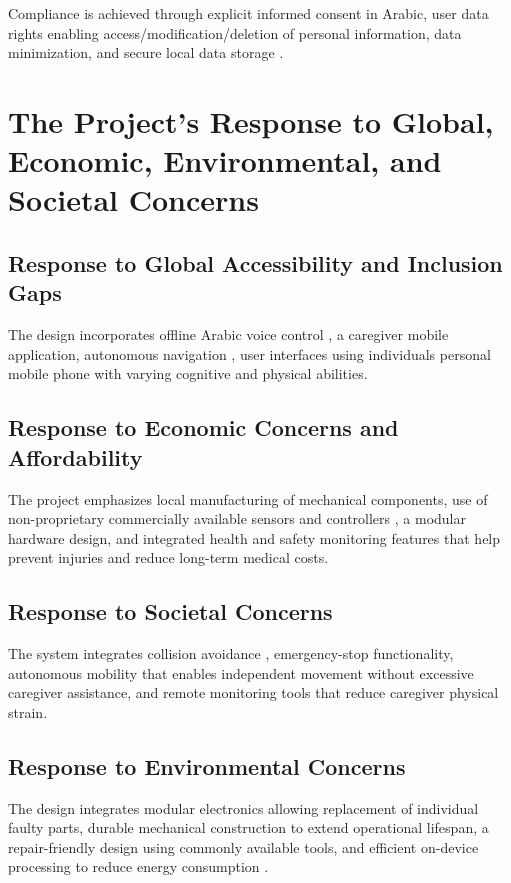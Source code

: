 \documentclass[12pt,a4paper]{report}
\begin{document}
Compliance is achieved through explicit informed consent in Arabic, user data rights enabling access/modification/deletion of personal information, data minimization, and secure local data storage \cite{egypt_law_151}.

\section{The Project's Response to Global, Economic, Environmental, and Societal Concerns}

\subsection{Response to Global Accessibility and Inclusion Gaps}

The design incorporates offline Arabic voice control , a caregiver mobile application, autonomous navigation \cite{nav2},  user interfaces using individuals personal mobile phone with varying cognitive and physical abilities.

\subsection{Response to Economic Concerns and Affordability}

The project emphasizes local manufacturing of mechanical components, use of non-proprietary commercially available sensors and controllers \cite{elalfy_monocular}, a modular hardware design, and integrated health and safety monitoring features that help prevent injuries and reduce long-term medical costs.

\subsection{Response to Societal Concerns}

The system integrates collision avoidance \cite{iso13482}, emergency-stop functionality, autonomous mobility \cite{nav2} that enables independent movement without excessive caregiver assistance, and remote monitoring tools that reduce caregiver physical strain.

\subsection{Response to Environmental Concerns}

The design integrates modular electronics allowing replacement of individual faulty parts, durable mechanical construction to extend operational lifespan, a repair-friendly design using commonly available tools, and efficient on-device processing to reduce energy consumption \cite{iso7176_4}.
\end{document}
